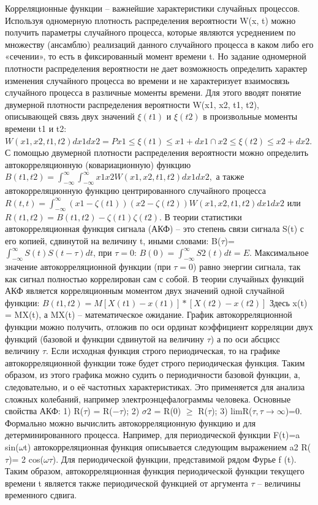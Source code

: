 \documentclass[a4paper, 12pt]{article}
\begin{document}
Корреляционные функции – важнейшие характеристики случайных процессов. Используя одномерную плотность распределения вероятности W(x, t) можно получить параметры случайного процесса, которые являются усреднением по множеству (ансамблю) реализаций данного случайного процесса в каком либо его «сечении», то есть в фиксированный момент времени t. Но задание одномерной плотности распределения вероятности не дает возможность определить характер изменения случайного процесса во времени и не характеризует взаимосвязь случайного процесса в различные моменты времени. Для этого вводят понятие двумерной плотности распределения вероятности
W(x1, x2, t1, t2), описывающей связь двух значений  $\xi(t1)$ и $\xi(t2)$ в произвольные моменты времени t1 и t2:
$W(x1,x2,t1,t2)dx1dx2 =P{x1 \leq \xi(t1) \leq x1 +dx1 \cap x2 \leq \xi(t2) \leq x2 +dx2}$.
С помощью двумерной плотности распределения вероятности можно определить автокорреляционную (ковариационную) функцию $B(t1,t2)=\int_{-\infty}^{\infty} \int_{-\infty}^{\infty} x1x2W(x1,x2,t1,t2)dx1dx2 ,$
а также автокорреляционную функцию центрированного случайного процесса
$R(t,t)=\int_{-\infty}^{\infty} (x1-\zeta(t1))(x2-\zeta(t2))W(x1,x2,t1,t2)dx1dx2$
или
$R(t1 ,t2 ) = B(t1 ,t2 ) - \zeta (t1 )\zeta (t2) $.
В теории статистики автокорреляционная функция сигнала (АКФ) – это степень связи сигнала S(t) с его копией, сдвинутой на величину t, иными словами:
B($\tau$)= $\int_{-\infty}^{\infty} S(t)S(t-\tau)dt$, 
при $\tau = 0$:
$B(0)= \int_{-\infty}^{\infty} S2(t)dt=E.$
Максимальное значение автокорреляционной функции (при $\tau=0$) равно энергии сигнала, так как сигнал полностью коррелирован сам с собой.
В теории случайных функций АКФ является корреляционным моментом двух значений одной случайной функции:
$B(t1,t2)=M{[X(t1)-x(t1)]*[X(t2)-x(t2)]}$
Здесь x(t) = MX(t), а MX(t) – математическое ожидание.
График автокорреляционной функции можно получить, отложив по оси ординат
коэффициент корреляции двух функций (базовой и функции сдвинутой на величину $\tau$) а по оси абсцисс величину $\tau$. Если исходная функция строго
периодическая, то на графике автокорреляционной функции тоже будет строго периодическая функция. Таким образом, из этого графика можно судить о периодичности базовой функции, а, следовательно, и о её частотных характеристиках. Это применяется для анализа сложных колебаний, например электроэнцефалограммы человека.
Основные свойства АКФ: 1) R($\tau$) = R($-\tau$);
2) $\sigma$2 = R(0) $\geq$ R($\tau$);
3) limR($\tau, \tau \to \infty$)=0.
Формально можно вычислить автокорреляционную функцию и для детерминированного процесса. Например, для периодической функции F(t)=a sin($\omega$t) автокорреляционная функция описывается следующим выражением
a2
R($\tau$)= 2 cos($\omega \tau$).
Для периодической функции, представимой рядом Фурье f (t).
Таким образом, автокорреляционная функция периодической функции текущего времени t является также периодической функцией от аргумента $\tau$ – величины временного сдвига.
	
\end{document}
